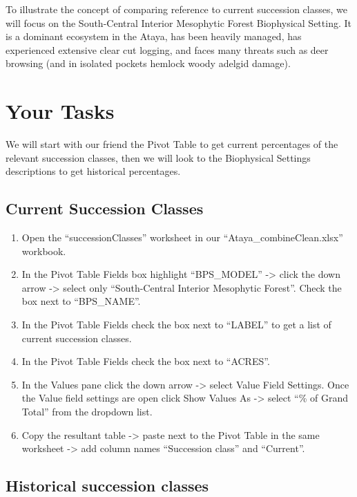 \documentclass[
]{book}
\providecommand{\tightlist}{%
  \setlength{\itemsep}{0pt}\setlength{\parskip}{0pt}}
\begin{document}
To illustrate the concept of comparing reference to current succession classes, we will focus on the South-Central Interior Mesophytic Forest Biophysical Setting. It is a dominant ecosystem in the Ataya, has been heavily managed, has experienced extensive clear cut logging, and faces many threats such as deer browsing (and in isolated pockets hemlock woody adelgid damage).

\hypertarget{your-tasks}{%
\section{Your Tasks}\label{your-tasks}}

We will start with our friend the Pivot Table to get current percentages of the relevant succession classes, then we will look to the Biophysical Settings descriptions to get historical percentages.

\hypertarget{current-succession-classes}{%
\subsection{Current Succession Classes}\label{current-succession-classes}}

\begin{enumerate}
\def\labelenumi{\arabic{enumi}.}
\tightlist
\item
  Open the ``successionClasses'' worksheet in our ``Ataya\_combineClean.xlsx'' workbook.
\item
  In the Pivot Table Fields box highlight ``BPS\_MODEL'' -\textgreater{} click the down arrow -\textgreater{} select only ``South-Central Interior Mesophytic Forest''. Check the box next to ``BPS\_NAME''.
\item
  In the Pivot Table Fields check the box next to ``LABEL'' to get a list of current succession classes.
\item
  In the Pivot Table Fields check the box next to ``ACRES''.
\item
  In the Values pane click the down arrow -\textgreater{} select Value Field Settings. Once the Value field settings are open click Show Values As -\textgreater{} select ``\% of Grand Total'' from the dropdown list.
\item
  Copy the resultant table -\textgreater{} paste next to the Pivot Table in the same worksheet -\textgreater{} add column names ``Succession class'' and ``Current''.
\end{enumerate}

\hypertarget{historical-succession-classes}{%
\subsection{Historical succession classes}\label{historical-succession-classes}}
\end{document}
